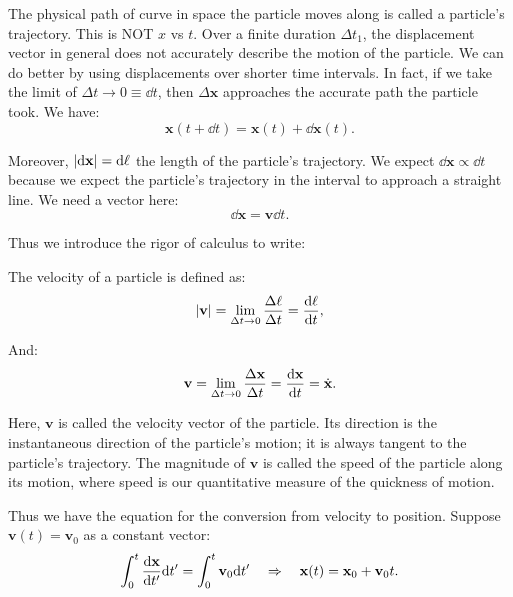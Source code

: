 \documentclass[10pt]{article}
\begin{document}
	The physical path of curve in space the particle moves along is called a particle's trajectory. This is NOT $x$ vs $t$. Over a finite duration $\Delta t_{1}$, the displacement vector in general does not accurately describe the motion of the particle. We can do better by using displacements over shorter time intervals. In fact, if we take the limit of $\Delta t \to 0 \equiv \dd t$, then $\Delta \mathbf{x}$ approaches the accurate path the particle took. We have:
	\begin{equation}
	  \mathbf{x}(t+\dd t) = \mathbf{x}(t) + \dd \mathbf{x}(t).
	\end{equation}

	Moreover, $\vqty{\dd \mathbf{x}} = \dd \ell$ the length of the particle's trajectory. We expect $\dd \mathbf{x} \propto \dd t$ because we expect the particle's trajectory in the interval to approach a straight line. We need a vector here:
	\begin{equation}
	  \dd \mathbf{x} = \mathbf{v} \dd t.
	\end{equation}

	Thus we introduce the rigor of calculus to write:
	\begin{claim}
		The velocity of a particle is defined as:
		\begin{equation}
		  \vqty{\mathbf{v}} = \lim_{\Delta t \to 0} \frac{\Delta \ell}{\Delta t} = \dv{\ell}{t},
		\end{equation}

		And:
		\begin{equation}
		  \mathbf{v} = \lim_{\Delta t \to 0} \frac{\Delta \mathbf{x}}{\Delta t} = \dv{\mathbf{x}}{t} = \dot{\mathbf{x}}.
		\end{equation}
	\end{claim}

	Here, $\mathbf{v}$ is called the velocity vector of the particle. Its direction is the instantaneous direction of the particle's motion; it is always tangent to the particle's trajectory. The magnitude of $\mathbf{v}$ is called the speed of the particle along its motion, where speed is our quantitative measure of the quickness of motion.

	Thus we have the equation for the conversion from velocity to position. Suppose $\mathbf{v}(t) = \boldsymbol{v}_{0}$ as a constant vector:
	\begin{equation}
	  \int_{0}^{t} \dv{\mathbf{x}}{t'} \dd t' = \int_{0}^{t}\mathbf{v}_{0}\dd t' \quad \Rightarrow \quad \mathbf{x}(t) = \mathbf{x}_{0}+\mathbf{v}_{0}t.
	\end{equation}
\end{document}

